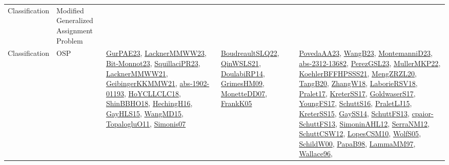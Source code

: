 {\begin{longtable}{lp{3cm}>{\raggedright}p{6cm}>{\raggedright}p{6cm}p{8cm}}
Classification & Modified Generalized Assignment Problem &  &  & \\
Classification & OSP & \href{articles/GurPAE23.pdf}{GurPAE23}\cite{GurPAE23}, \href{articles/LacknerMMWW23.pdf}{LacknerMMWW23}\cite{LacknerMMWW23}, \href{papers/Bit-Monnot23.pdf}{Bit-Monnot23}\cite{Bit-Monnot23}, \href{papers/SquillaciPR23.pdf}{SquillaciPR23}\cite{SquillaciPR23}, \href{papers/LacknerMMWW21.pdf}{LacknerMMWW21}\cite{LacknerMMWW21}, \href{papers/GeibingerKKMMW21.pdf}{GeibingerKKMMW21}\cite{GeibingerKKMMW21}, \href{articles/abs-1902-01193.pdf}{abs-1902-01193}\cite{abs-1902-01193}, \href{papers/HoYCLLCLC18.pdf}{HoYCLLCLC18}\cite{HoYCLLCLC18}, \href{articles/ShinBBHO18.pdf}{ShinBBHO18}\cite{ShinBBHO18}, \href{papers/HechingH16.pdf}{HechingH16}\cite{HechingH16}, \href{papers/GayHLS15.pdf}{GayHLS15}\cite{GayHLS15}, \href{articles/WangMD15.pdf}{WangMD15}\cite{WangMD15}, \href{articles/TopalogluO11.pdf}{TopalogluO11}\cite{TopalogluO11}, \href{articles/Simonis07.pdf}{Simonis07}\cite{Simonis07} & \href{papers/BoudreaultSLQ22.pdf}{BoudreaultSLQ22}\cite{BoudreaultSLQ22}, \href{articles/QinWSLS21.pdf}{QinWSLS21}\cite{QinWSLS21}, \href{papers/DoulabiRP14.pdf}{DoulabiRP14}\cite{DoulabiRP14}, \href{papers/GrimesHM09.pdf}{GrimesHM09}\cite{GrimesHM09}, \href{papers/MonetteDD07.pdf}{MonetteDD07}\cite{MonetteDD07}, \href{papers/FrankK05.pdf}{FrankK05}\cite{FrankK05} & \href{papers/PovedaAA23.pdf}{PovedaAA23}\cite{PovedaAA23}, \href{papers/WangB23.pdf}{WangB23}\cite{WangB23}, \href{articles/MontemanniD23.pdf}{MontemanniD23}\cite{MontemanniD23}, \href{articles/abs-2312-13682.pdf}{abs-2312-13682}\cite{abs-2312-13682}, \href{papers/PerezGSL23.pdf}{PerezGSL23}\cite{PerezGSL23}, \href{articles/MullerMKP22.pdf}{MullerMKP22}\cite{MullerMKP22}, \href{articles/KoehlerBFFHPSSS21.pdf}{KoehlerBFFHPSSS21}\cite{KoehlerBFFHPSSS21}, \href{articles/MengZRZL20.pdf}{MengZRZL20}\cite{MengZRZL20}, \href{papers/TangB20.pdf}{TangB20}\cite{TangB20}, \href{articles/ZhangW18.pdf}{ZhangW18}\cite{ZhangW18}, \href{articles/LaborieRSV18.pdf}{LaborieRSV18}\cite{LaborieRSV18}, \href{papers/Pralet17.pdf}{Pralet17}\cite{Pralet17}, \href{articles/KreterSS17.pdf}{KreterSS17}\cite{KreterSS17}, \href{papers/GoldwaserS17.pdf}{GoldwaserS17}\cite{GoldwaserS17}, \href{papers/YoungFS17.pdf}{YoungFS17}\cite{YoungFS17}, \href{papers/SchuttS16.pdf}{SchuttS16}\cite{SchuttS16}, \href{papers/PraletLJ15.pdf}{PraletLJ15}\cite{PraletLJ15}, \href{papers/KreterSS15.pdf}{KreterSS15}\cite{KreterSS15}, \href{papers/GaySS14.pdf}{GaySS14}\cite{GaySS14}, \href{papers/SchuttFS13.pdf}{SchuttFS13}\cite{SchuttFS13}, \href{papers/cpaior-SchuttFS13.pdf}{cpaior-SchuttFS13}\cite{cpaior-SchuttFS13}, \href{papers/SimoninAHL12.pdf}{SimoninAHL12}\cite{SimoninAHL12}, \href{papers/SerraNM12.pdf}{SerraNM12}\cite{SerraNM12}, \href{papers/SchuttCSW12.pdf}{SchuttCSW12}\cite{SchuttCSW12}, \href{articles/LopesCSM10.pdf}{LopesCSM10}\cite{LopesCSM10}, \href{papers/WolfS05.pdf}{WolfS05}\cite{WolfS05}, \href{articles/SchildW00.pdf}{SchildW00}\cite{SchildW00}, \href{articles/PapaB98.pdf}{PapaB98}\cite{PapaB98}, \href{articles/LammaMM97.pdf}{LammaMM97}\cite{LammaMM97}, \href{articles/Wallace96.pdf}{Wallace96}\cite{Wallace96}, 
\end{longtable}}
